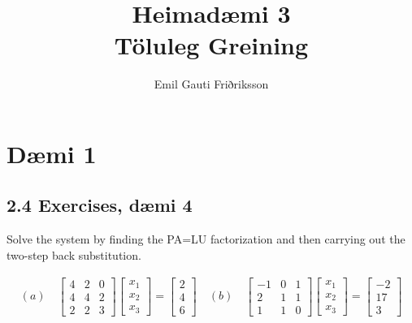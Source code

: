 \documentclass[11pt]{article}
\title{Heimadæmi 3\\ \vspace{0.4cm} \large Töluleg Greining}
\author{Emil Gauti Friðriksson}
\begin{document}
\maketitle
\section*{Dæmi 1}
\subsection*{2.4 Exercises, dæmi 4}
Solve the system by finding the PA=LU factorization and then carrying out the two-step back
substitution.

\begin{align*}
(a)\quad
\begin{bmatrix}
4 & 2 & 0\\
4 & 4 & 2\\
2 & 2 & 3
\end{bmatrix}
\begin{bmatrix}
x_1\\
x_2\\
x_3
\end{bmatrix}
=
\begin{bmatrix}
2\\
4\\
6
\end{bmatrix}
\quad (b) \quad
\begin{bmatrix}
-1 & 0 & 1\\
2  & 1 & 1\\
1  & 1 & 0
\end{bmatrix}
\begin{bmatrix}
x_1\\
x_2\\
x_3
\end{bmatrix}
=
\begin{bmatrix}
-2\\
17\\
3
\end{bmatrix}
\end{align*}
\end{document}
